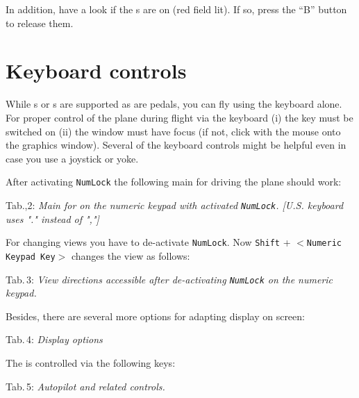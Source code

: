 In addition, have a look if the s are on (red
field lit). If so, press the ``B'' button to release them.

\section{Keyboard controls}

While s or s are supported as are  pedals, you
can fly \FlightGear{} using the keyboard alone. For proper control of the plane during
flight via the keyboard (i) the \texttt{} key must be switched on (ii) the
\FlightGear{} window must have focus (if not, click with the mouse onto the graphics
window). Several of the keyboard controls might be helpful even in case you use a
joystick or yoke.

After activating \texttt{NumLock} the following main  for driving the plane should work:
 \eject

\noindent
 Tab.,2: \textit{Main  for \FlightGear{} on the
 numeric keypad with activated \texttt{NumLock}.
 [U.S. keyboard uses "." instead of ","]}
\medskip

\centerline{}
\vskip 5mm

For changing views you have to de-activate \texttt{NumLock}. Now \texttt{Shift} +
$<$\texttt{Numeric Keypad Key}$>$ changes the view as follows:
\medskip

\noindent
 Tab.\,3: \textit{View directions
accessible after de-activating \texttt{NumLock} on the numeric keypad.}
\medskip

\centerline{}
\vskip 5mm
Besides, there are several more options for adapting display on screen:
\vfill
\eject

\noindent
 Tab.\,4: \textit{Display options}
\medskip

\centerline{}
\vskip 5mm

The  is controlled via the following keys:
\medskip

\noindent
 Tab.\,5: \textit{Autopilot and related controls.}
\medskip

